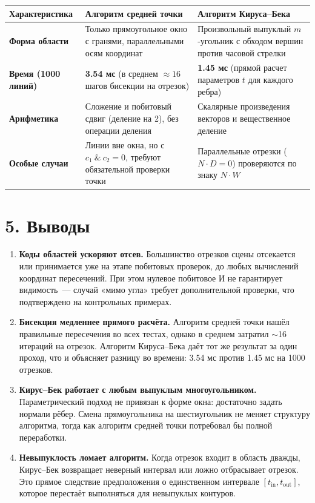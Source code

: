 \documentclass[11pt,a4paper]{article}
\begin{document}
\begin{table}[H]
\centering
\begin{tabular}{@{}p{3.8cm}>{\raggedright\arraybackslash}p{6.4cm}>{\raggedright\arraybackslash}p{6.4cm}@{}}
\toprule
\textbf{Характеристика} & \textbf{Алгоритм средней точки} & \textbf{Алгоритм Кируса--Бека} \\
\midrule
\textbf{Форма области} & Только прямоугольное окно с гранями, параллельными осям координат & Произвольный выпуклый $m$-угольник с обходом вершин против часовой стрелки \\
\textbf{Время (1000 линий)} & \textbf{3.54 мс} (в среднем $\approx 16$ шагов бисекции на отрезок) & \textbf{1.45 мс} (прямой расчет параметров $t$ для каждого ребра) \\
\textbf{Арифметика} & Сложение и побитовый сдвиг (деление на 2), без операции деления & Скалярные произведения векторов и вещественное деление \\
\textbf{Особые случаи} & Линии вне окна, но с $c_1 \ \& \ c_2 = 0$, требуют обязательной проверки точки & Параллельные отрезки ($N \cdot D = 0$) проверяются по знаку $N \cdot W$ \\
\bottomrule
\end{tabular}
\end{table}

\newpage

\section*{5. Выводы}
\begin{enumerate}
    \item \textbf{Коды областей ускоряют отсев.} Большинство отрезков сцены отсекается или принимается уже на этапе побитовых проверок, до любых вычислений координат пересечений. При этом нулевое побитовое И не гарантирует видимость~--- случай «мимо угла» требует дополнительной проверки, что подтверждено на контрольных примерах.
    \item \textbf{Бисекция медленнее прямого расчёта.} Алгоритм средней точки нашёл правильные пересечения во всех тестах, однако в среднем затратил $\sim$16 итераций на отрезок. Алгоритм Кируса--Бека даёт тот же результат за один проход, что и объясняет разницу во времени: 3.54 мс против 1.45 мс на 1000 отрезков.
    \item \textbf{Кирус--Бек работает с любым выпуклым многоугольником.} Параметрический подход не привязан к форме окна: достаточно задать нормали рёбер. Смена прямоугольника на шестиугольник не меняет структуру алгоритма, тогда как алгоритм средней точки потребовал бы полной переработки.
    \item \textbf{Невыпуклость ломает алгоритм.} Когда отрезок входит в область дважды, Кирус--Бек возвращает неверный интервал или ложно отбрасывает отрезок. Это прямое следствие предположения о единственном интервале $[t_{\text{in}}, t_{\text{out}}]$, которое перестаёт выполняться для невыпуклых контуров.
\end{enumerate}
\end{document}
